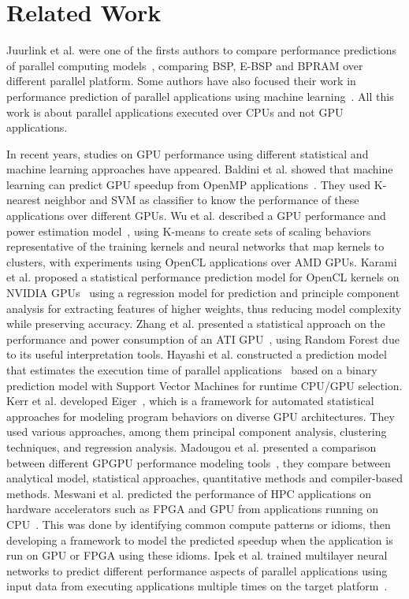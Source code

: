 \section{Related Work}\label{sec:RelatedWork}
Juurlink et al. were one of the firsts authors to compare performance predictions of parallel computing models~\cite{Juurlink:1998}, comparing BSP, E-BSP and BPRAM over different parallel platform. Some authors have also focused their work in performance prediction of parallel applications using machine learning~\cite{Singh:2007:PPA}. All this work is about parallel applications executed over CPUs and not GPU applications.

In  recent  years,  studies on GPU performance using different statistical and machine learning approaches have appeared. Baldini et al. showed that machine learning can predict GPU speedup from OpenMP applications~\cite{Baldini:2014}. They used K-nearest neighbor and SVM as classifier to know the performance of these applications over different GPUs. Wu et al. described a GPU performance and power estimation model~\cite{Greathouse:2015:GPGPUML}, using K-means to create sets of scaling behaviors representative of the training kernels and neural networks that map kernels to clusters, with experiments using OpenCL applications over AMD GPUs. Karami et al. proposed a statistical performance prediction model for OpenCL kernels on NVIDIA GPUs~\cite{Karami:2013} using a regression model for prediction and principle component analysis for extracting features of higher weights, thus reducing model complexity while preserving accuracy. Zhang et al. presented  a statistical approach on  the  performance and power consumption of an ATI GPU~\cite{Zhang:2011}, using Random Forest due to its useful interpretation tools. Hayashi et al. constructed a prediction model that estimates the execution time of parallel applications~\cite{Hayashi:2015:MPH} based on a binary prediction model with Support Vector Machines for runtime CPU/GPU selection. Kerr et al. developed Eiger~\cite{Kerr:2012:Eiger}, which is a framework for automated  statistical approaches for modeling program behaviors on diverse GPU architectures. They used various approaches, among them principal component analysis, clustering techniques, and regression analysis. Madougou et al. presented a comparison between different GPGPU performance modeling tools~\cite{Madougou201618}, they compare between analytical model, statistical approaches, quantitative methods and compiler-based methods. Meswani et al. predicted the performance of HPC applications on hardware accelerators such as FPGA and GPU from applications running on CPU~\cite{6270861}. This was done by identifying common compute patterns or idioms, then developing a framework to model the predicted speedup when the application is run on GPU or FPGA using these idioms. Ipek et al. trained multilayer neural networks to predict different performance aspects of parallel applications using input data from executing applications multiple times on the target platform~\cite{Ipek:2005:APP:2138773.2138800}.

